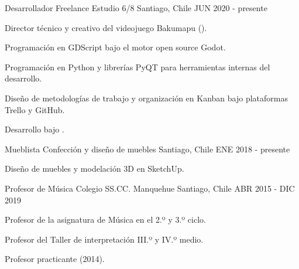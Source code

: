 

\begin{cventries}

  \cventry
    {Desarrollador Freelance} %
    {Estudio 6/8} %
    {Santiago, Chile} %
    {JUN 2020 - presente} %
    {
      \begin{cvitems} %
        \item {Director técnico y creativo del videojuego Bakumapu ().}
        \item {Programación en GDScript bajo el motor open source Godot.}
        \item {Programación en Python y librerías PyQT para herramientas internas del desarrollo.}
        \item {Diseño de metodologías de trabajo y organización en Kanban bajo plataformas Trello y GitHub.}
        \item {Desarrollo bajo .}
      \end{cvitems}
    }

  \cventry
    {Mueblista} %
    {Confección y diseño de muebles} %
    {Santiago, Chile} %
    {ENE 2018 - presente} %
    {
      \begin{cvitems} %
        \item {Diseño de muebles y modelación 3D en SketchUp.}
      \end{cvitems}
    }

  \cventry
    {Profesor de Música} %
    {Colegio SS.CC. Manquehue} %
    {Santiago, Chile} %
    {ABR 2015 - DIC 2019} %
    {
      \begin{cvitems} %
        \item {Profesor de la asignatura de Música en el 2.º y 3.º ciclo.}
        \item {Profesor del Taller de interpretación III.º y IV.º medio.}
        \item {Profesor practicante (2014).}
      \end{cvitems}
    }


\end{cventries}
